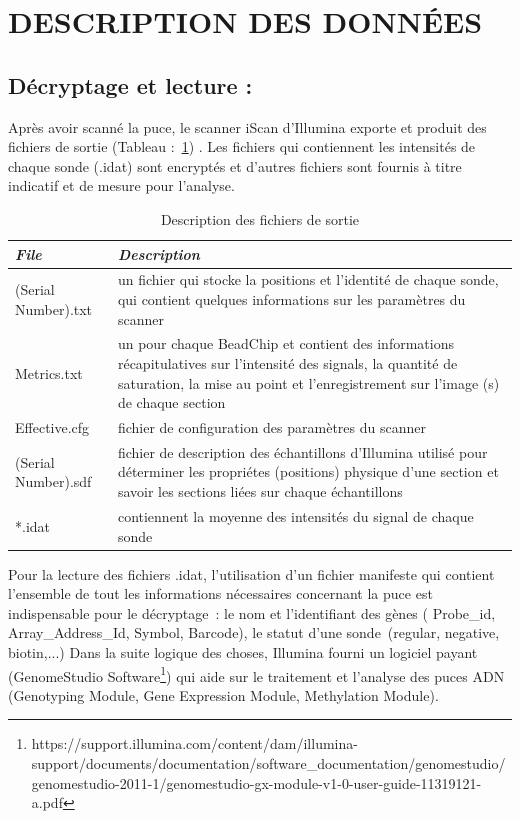 \documentclass[a4paper,10pt]{article}
\begin{document}
\section{DESCRIPTION DES DONN\'{E}ES }
\subsection{ Décryptage et lecture :}
Après avoir scanné la puce, le scanner iScan d’Illumina exporte et produit des fichiers de sortie (Tableau :~\ref{Fichiers_Sorties}) .
Les fichiers qui contiennent les intensités de chaque sonde (.idat) sont encryptés et d’autres fichiers sont fournis à titre indicatif et de mesure pour l’analyse.\\
\begin{table}[!ht]
\begin{tabular}{|p{3cm}|p{9cm}|}
\hline
\emph{File}  & \emph{Description} \\
\hline
 (Serial Number).txt & un fichier qui stocke la positions et l'identité de chaque sonde, qui contient quelques informations sur les paramètres du scanner\\
\hline
Metrics.txt &  un pour chaque BeadChip  et contient des informations récapitulatives sur l'intensité des signals,
la quantité de saturation, la mise au point et l'enregistrement sur l'image (s) de chaque section \\
\hline 
Effective.cfg & fichier de configuration des paramètres du scanner\\
\hline
(Serial Number).sdf & fichier de description des échantillons d'Illumina utilisé pour déterminer les propriétes (positions)
physique d'une section et savoir les sections liées sur chaque échantillons\\
\hline
*.idat & contiennent la moyenne des intensités du signal de chaque sonde \\
\hline
\end{tabular}
\caption{Description des fichiers de sortie}
\label{Fichiers_Sorties}
\end{table}
\newline
Pour la lecture  des fichiers .idat, l’utilisation d’un fichier manifeste qui contient l’ensemble de tout les informations nécessaires concernant la puce est indispensable pour le décryptage : le nom et l’identifiant  des gènes ( Probe\_id, Array\_Address\_Id, Symbol, Barcode), le statut d’une sonde (regular, negative, biotin,...)
Dans la suite logique des choses, Illumina fourni un logiciel payant (GenomeStudio Software\footnote{https://support.illumina.com/content/dam/illumina-support/documents/documentation/software\_documentation/genomestudio/genomestudio-2011-1/genomestudio-gx-module-v1-0-user-guide-11319121-a.pdf})  qui aide sur le traitement et l'analyse des puces ADN (Genotyping Module, Gene Expression Module, Methylation Module).
\end{document}
